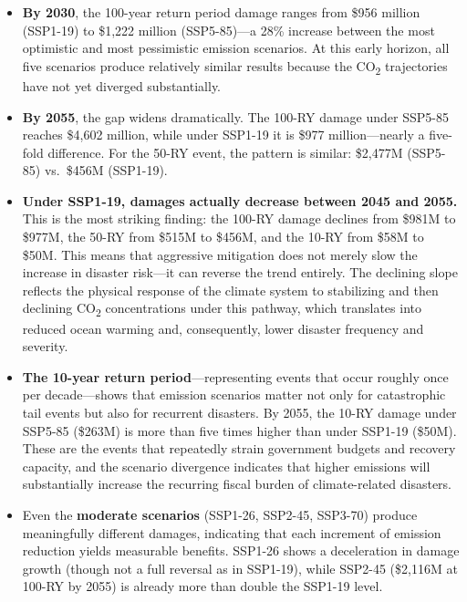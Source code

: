 \documentclass[11pt,a4paper]{article}
\begin{document}
\begin{itemize}[leftmargin=2em]
  \item \textbf{By 2030}, the 100-year return period damage ranges from \$956 million (SSP1-19) to \$1,222 million (SSP5-85)---a 28\% increase between the most optimistic and most pessimistic emission scenarios. At this early horizon, all five scenarios produce relatively similar results because the CO\textsubscript{2} trajectories have not yet diverged substantially.

  \item \textbf{By 2055}, the gap widens dramatically. The 100-RY damage under SSP5-85 reaches \$4,602 million, while under SSP1-19 it is \$977 million---nearly a five-fold difference. For the 50-RY event, the pattern is similar: \$2,477M (SSP5-85) vs.\ \$456M (SSP1-19).

  \item \textbf{Under SSP1-19, damages actually decrease between 2045 and 2055.} This is the most striking finding: the 100-RY damage declines from \$981M to \$977M, the 50-RY from \$515M to \$456M, and the 10-RY from \$58M to \$50M. This means that aggressive mitigation does not merely slow the increase in disaster risk---it can reverse the trend entirely. The declining slope reflects the physical response of the climate system to stabilizing and then declining CO\textsubscript{2} concentrations under this pathway, which translates into reduced ocean warming and, consequently, lower disaster frequency and severity.

  \item \textbf{The 10-year return period}---representing events that occur roughly once per decade---shows that emission scenarios matter not only for catastrophic tail events but also for recurrent disasters. By 2055, the 10-RY damage under SSP5-85 (\$263M) is more than five times higher than under SSP1-19 (\$50M). These are the events that repeatedly strain government budgets and recovery capacity, and the scenario divergence indicates that higher emissions will substantially increase the recurring fiscal burden of climate-related disasters.

  \item Even the \textbf{moderate scenarios} (SSP1-26, SSP2-45, SSP3-70) produce meaningfully different damages, indicating that each increment of emission reduction yields measurable benefits. SSP1-26 shows a deceleration in damage growth (though not a full reversal as in SSP1-19), while SSP2-45 (\$2,116M at 100-RY by 2055) is already more than double the SSP1-19 level.
\end{itemize}
\end{document}
